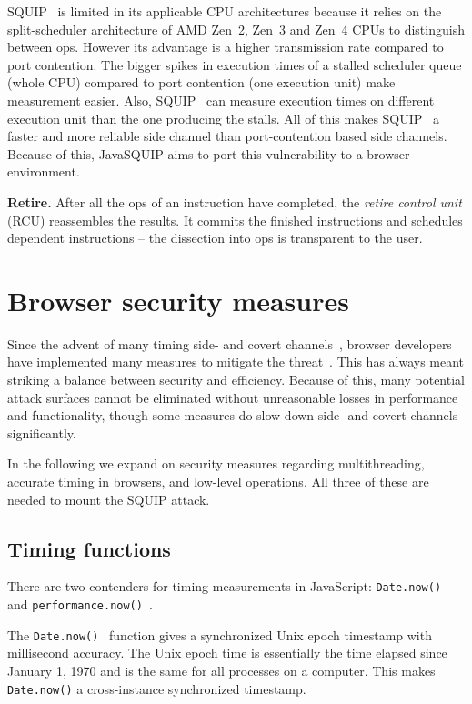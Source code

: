 \documentclass[11pt,
  titlepage=false,
]{scrreprt}
\begin{document}
SQUIP~\cite{squip} is limited in its applicable CPU architectures because it relies on the split-scheduler architecture of AMD Zen~2, Zen~3 and Zen~4 CPUs to distinguish between \textmu ops.
However its advantage is a higher transmission rate compared to port contention.
The bigger spikes in execution times of a stalled scheduler queue (whole CPU) compared to port contention (one execution unit) make measurement easier.
Also, SQUIP~\cite{squip} can measure execution times on different execution unit than the one producing the stalls.
All of this makes SQUIP~\cite{squip} a faster and more reliable side channel than port-contention based side channels.
Because of this, JavaSQUIP aims to port this vulnerability to a browser environment.


\textbf{Retire.}
After all the \textmu ops of an instruction have completed, the \textit{retire control unit} (RCU) reassembles the results.
It commits the finished instructions and schedules dependent instructions -- the dissection into \textmu ops is transparent to the user.


\section{Browser security measures}
\label{sec:browsersecurity}
Since the advent of many timing side- and covert channels~\cite{noack2018exploiting, Rokicki2022webport, gruss2016rowhammer},
browser developers have implemented many measures to mitigate the threat~\cite{shusterman2021prime, performancenow, performancenowchrome}.
This has always meant striking a balance between security and efficiency.
Because of this, many potential attack surfaces cannot be eliminated without unreasonable losses in performance and functionality,
though some measures do slow down side- and covert channels significantly.

In the following we expand on security measures regarding multithreading, accurate timing in browsers, and low-level operations.
All three of these are needed to mount the SQUIP attack.


\subsection{Timing functions}\label{subsec:timingjs}
There are two contenders for timing measurements in JavaScript: \texttt{Date.now()}~\cite{datenow} and \texttt{performance.now()}~\cite{performancenow}.

The \texttt{Date.now()}~\cite{datenow} function gives a synchronized Unix epoch timestamp with millisecond accuracy.
The Unix epoch time is essentially the time elapsed since January 1, 1970 and is the same for all processes on a computer.
This makes \texttt{Date.now()} a cross-instance synchronized timestamp.
\end{document}
